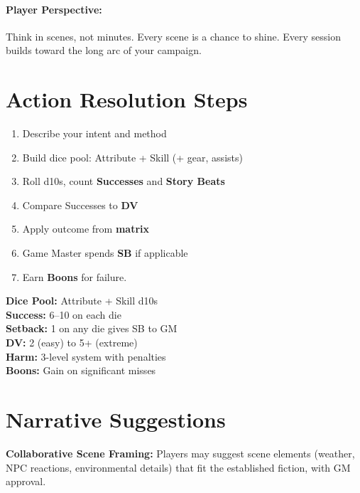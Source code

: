 \paragraph{Player Perspective:}  
Think in scenes, not minutes. Every scene is a chance to shine. Every session builds toward the long arc of your campaign.

\section{Action Resolution Steps}

\begin{enumerate}
  \item Describe your intent and method
  \item Build dice pool: Attribute + Skill (+ gear, assists)
  \item Roll d10s, count \textbf{Successes} and \textbf{Story Beats}
  \item Compare Successes to \textbf{DV}
  \item Apply outcome from \textbf{matrix}
  \item Game Master spends \textbf{SB} if applicable
  \item Earn \textbf{Boons} for failure.
\end{enumerate}

\begin{tcolorbox}[colback=blue!5!white,colframe=blue!75!black,title=Quick Reference,fonttitle=\bfseries]
\textbf{Dice Pool:} Attribute + Skill d10s \\
\textbf{Success:} 6--10 on each die \\
\textbf{Setback:} 1 on any die gives SB to GM \\
\textbf{DV:} 2 (easy) to 5+ (extreme) \\
\textbf{Harm:} 3-level system with penalties \\
\textbf{Boons:} Gain on significant misses 
\end{tcolorbox}

\section{Narrative Suggestions}

\textbf{Collaborative Scene Framing:} Players may suggest scene elements (weather, NPC reactions, environmental details) that fit the established fiction, with GM approval.

